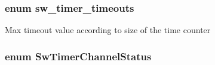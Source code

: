 \subsubsection[{\texorpdfstring{sw\+\_\+timer\+\_\+timeouts}{sw_timer_timeouts}}]{\setlength{\rightskip}{0pt plus 5cm}enum {\bf sw\+\_\+timer\+\_\+timeouts}}\hypertarget{group__sw__timer_ga8eb74c42765e0114fb15920babe0db28}{}\label{group__sw__timer_ga8eb74c42765e0114fb15920babe0db28}
Max timeout value according to size of the time counter 
\subsubsection[{\texorpdfstring{Sw\+Timer\+Channel\+Status}{SwTimerChannelStatus}}]{\setlength{\rightskip}{0pt plus 5cm}enum {\bf Sw\+Timer\+Channel\+Status}}\hypertarget{group__sw__timer_ga44b572e8abe4da32037ad911b133f0be}{}\label{group__sw__timer_ga44b572e8abe4da32037ad911b133f0be}
